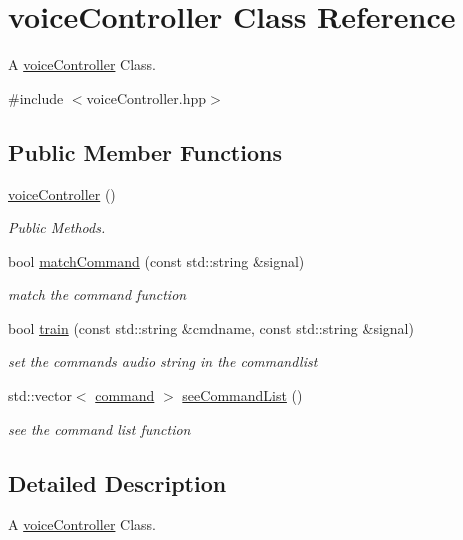 \hypertarget{classvoiceController}{}\section{voice\+Controller Class Reference}
\label{classvoiceController}


A \hyperlink{classvoiceController}{voice\+Controller} Class.  




{\ttfamily \#include $<$voice\+Controller.\+hpp$>$}

\subsection*{Public Member Functions}
\begin{DoxyCompactItemize}
\item 
\hyperlink{classvoiceController_a8746e8b3c0efd2735b6b8a816fbacce4}{voice\+Controller} ()
\begin{DoxyCompactList}\small\item\em Public Methods. \end{DoxyCompactList}\item 
bool \hyperlink{classvoiceController_af851fc9ef22db782ec0e03a159c88711}{match\+Command} (const std\+::string \&signal)
\begin{DoxyCompactList}\small\item\em match the command function \end{DoxyCompactList}\item 
bool \hyperlink{classvoiceController_a8bcf53c67777c9808bc54c10001da941}{train} (const std\+::string \&cmdname, const std\+::string \&signal)
\begin{DoxyCompactList}\small\item\em set the command\textquotesingle{}s audio string in the commandlist \end{DoxyCompactList}\item 
std\+::vector$<$ \hyperlink{classcommand}{command} $>$ \hyperlink{classvoiceController_a400c690ab78be3dcb186aa22fcaacee4}{see\+Command\+List} ()
\begin{DoxyCompactList}\small\item\em see the command list function \end{DoxyCompactList}\end{DoxyCompactItemize}


\subsection{Detailed Description}
A \hyperlink{classvoiceController}{voice\+Controller} Class. 

